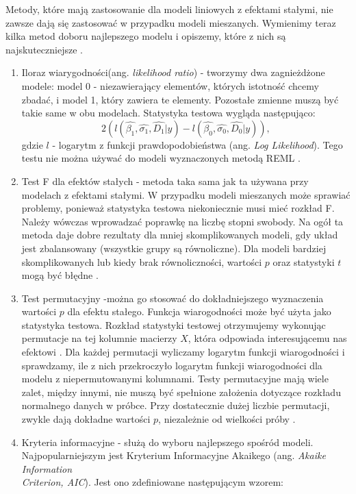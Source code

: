 \documentclass[12pt]{mwbk}
\theoremstyle{plain}
\theoremstyle{definition}
\theoremstyle{remark}
\begin{document}
Metody, które mają zastosowanie dla modeli liniowych z efektami stałymi, nie zawsze dają się zastosować w przypadku modeli mieszanych. Wymienimy teraz kilka metod doboru najlepszego modelu i opiszemy, które z nich są najskuteczniejsze \cite{faraway}.

\begin{enumerate}
	\item Iloraz wiarygodności(ang. \textit{likelihood ratio}) - tworzymy dwa zagnieżdżone modele: model 0 - niezawierający elementów, których istotność chcemy zbadać, i model 1, który zawiera te elementy. Pozostałe zmienne muszą być takie same w obu modelach.
	Statystyka testowa wygląda następująco:
	$$2(l(\hat{\beta_1}, \hat{\sigma_1}, \hat{D_1}|y)-l(\hat{\beta_0}, \hat{\sigma_0}, \hat{D_0}|y)),$$
	gdzie $l$ - logarytm z funkcji prawdopodobieństwa (ang. \textit{Log Likelihood}). Tego testu nie można używać do modeli wyznaczonych metodą REML \cite{faraway}.
	
	\item Test F dla efektów stałych - metoda taka sama jak ta używana przy modelach z efektami stałymi. W przypadku modeli mieszanych może sprawiać problemy, ponieważ statystyka testowa niekoniecznie musi mieć rozkład F. Należy wówczas wprowadzać poprawkę na liczbę stopni swobody. Na ogół ta metoda daje dobre rezultaty dla mniej skomplikowanych modeli, gdy układ jest zbalansowany (wszystkie grupy są równoliczne). Dla modeli bardziej skomplikowanych lub kiedy brak równoliczności, wartości $p$ oraz statystyki $t$ mogą być błędne \cite{faraway}.
	
	\item Test permutacyjny -można go stosować do dokładniejszego wyznaczenia wartości $p$ dla efektu stałego. Funkcja wiarogodności może być użyta jako statystyka testowa. Rozkład statystyki testowej otrzymujemy wykonując permutacje na tej kolumnie macierzy $X$, która odpowiada interesującemu nas efektowi \cite{biecek}. Dla każdej permutacji wyliczamy logarytm funkcji wiarogodności i sprawdzamy, ile z nich przekroczyło logarytm funkcji wiarogodności dla modelu z niepermutowanymi kolumnami. Testy permutacyjne mają wiele zalet, między innymi, nie muszą być spełnione założenia dotyczące rozkładu normalnego danych w próbce. Przy dostatecznie dużej liczbie permutacji, zwykle dają dokładne wartości $p$, niezależnie od wielkości próby \cite{bootstrap}.
	


	\item Kryteria informacyjne - służą do wyboru najlepszego spośród modeli. Najpopularniejszym jest Kryterium Informacyjne Akaikego (ang. \textit{Akaike Information \\Criterion, AIC}). Jest ono zdefiniowane następującym wzorem:
	

\end{enumerate}
\end{document}

